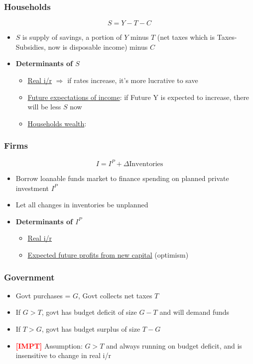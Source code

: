 \documentclass{article}
\newcommand{\impt}[0]{\textcolor{red}{\textbf{[IMPT] }}}
\begin{document}
\begin{multicols}{2}
\subsubsection{Households}
$$S = Y - T - C$$
\begin{itemize}
	\item $S$ is supply of savings, a portion of $Y$ minus $T$ (net taxes which is Taxes-Subsidies, now is disposable income) minus $C$
	\item \textbf{Determinants of $S$}
	\begin{itemize}
		\item \underline{Real i/r} $\Rightarrow$ if rates increase, it's more lucrative to save
		\item \underline{Future expectations of income}: if Future Y is expected to increase, there will be less $S$ now
		\item \underline{Households wealth}:
	\end{itemize}
\end{itemize}
\subsubsection{Firms}
$$I = I^P + \Delta\text{Inventories}$$
\begin{itemize}
	\item Borrow loanable funds market to finance spending on planned private investment $I^P$
	\item Let all changes in inventories be unplanned
	\item \textbf{Determinants of $I^P$}
	\begin{itemize}
		\item \underline{Real i/r}
		\item \underline{Expected future profits from new capital} (optimism)
	\end{itemize}
\end{itemize}
\subsubsection{Government}
\begin{itemize}
	\item Govt purchases = $G$, Govt collects net taxes $T$
	\item If $G>T $, govt has budget deficit of size $G-T$ and will demand funds
	\item If $T>G$, govt has budget surplus of size $T-G$
	\item \impt Assumption: $G>T$ and always running on budget deficit, and is insensitive to change in real i/r
\end{itemize}

\end{multicols}
\end{document}
